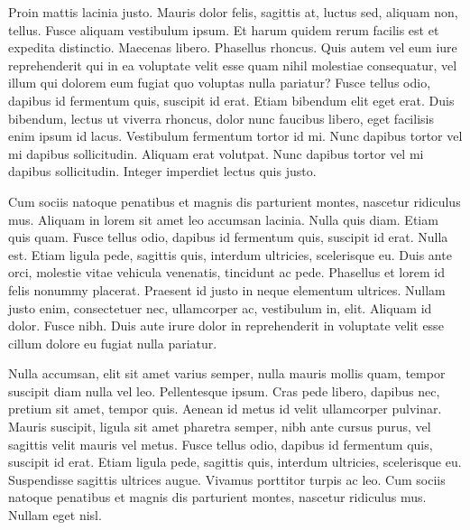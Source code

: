 Proin mattis lacinia justo. Mauris dolor felis, sagittis at, luctus sed, aliquam non, tellus. Fusce aliquam vestibulum ipsum. Et harum quidem rerum facilis est et expedita distinctio. Maecenas libero. Phasellus rhoncus. Quis autem vel eum iure reprehenderit qui in ea voluptate velit esse quam nihil molestiae consequatur, vel illum qui dolorem eum fugiat quo voluptas nulla pariatur? Fusce tellus odio, dapibus id fermentum quis, suscipit id erat. Etiam bibendum elit eget erat. Duis bibendum, lectus ut viverra rhoncus, dolor nunc faucibus libero, eget facilisis enim ipsum id lacus. Vestibulum fermentum tortor id mi. Nunc dapibus tortor vel mi dapibus sollicitudin. Aliquam erat volutpat. Nunc dapibus tortor vel mi dapibus sollicitudin. Integer imperdiet lectus quis justo.

Cum sociis natoque penatibus et magnis dis parturient montes, nascetur ridiculus mus. Aliquam in lorem sit amet leo accumsan lacinia. Nulla quis diam. Etiam quis quam. Fusce tellus odio, dapibus id fermentum quis, suscipit id erat. Nulla est. Etiam ligula pede, sagittis quis, interdum ultricies, scelerisque eu. Duis ante orci, molestie vitae vehicula venenatis, tincidunt ac pede. Phasellus et lorem id felis nonummy placerat. Praesent id justo in neque elementum ultrices. Nullam justo enim, consectetuer nec, ullamcorper ac, vestibulum in, elit. Aliquam id dolor. Fusce nibh. Duis aute irure dolor in reprehenderit in voluptate velit esse cillum dolore eu fugiat nulla pariatur.

Nulla accumsan, elit sit amet varius semper, nulla mauris mollis quam, tempor suscipit diam nulla vel leo. Pellentesque ipsum. Cras pede libero, dapibus nec, pretium sit amet, tempor quis. Aenean id metus id velit ullamcorper pulvinar. Mauris suscipit, ligula sit amet pharetra semper, nibh ante cursus purus, vel sagittis velit mauris vel metus. Fusce tellus odio, dapibus id fermentum quis, suscipit id erat. Etiam ligula pede, sagittis quis, interdum ultricies, scelerisque eu. Suspendisse sagittis ultrices augue. Vivamus porttitor turpis ac leo. Cum sociis natoque penatibus et magnis dis parturient montes, nascetur ridiculus mus. Nullam eget nisl. 
